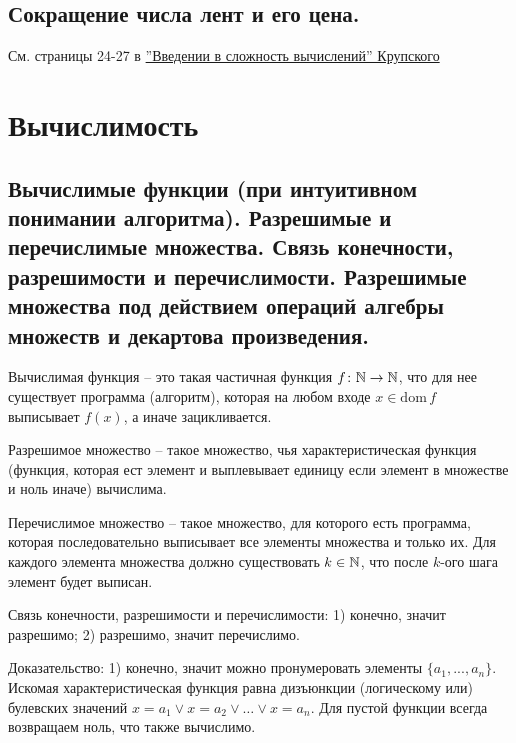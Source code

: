 \documentclass[a4paper, 10pt]{article}
\newcommand{\dom}{\text{dom}\,}
\begin{document}
\subsection{Сокращение числа лент и его цена.}

См. страницы 24-27 в \href{https://static42.fileskachat.com/download/6/c/33377_672968aac1311878215538743df4fbd9.pdf}{''Введении в сложность вычислений'' Крупского}

\section{Вычислимость}

\subsection{Вычислимые функции (при интуитивном понимании алгоритма). Разрешимые и перечислимые множества. Связь конечности, разрешимости и перечислимости. Разрешимые множества под действием операций алгебры множеств и декартова произведения.}

Вычислимая функция -- это такая частичная функция $f\colon\mathbb{N}\to\mathbb{N}$, что для нее существует программа (алгоритм), которая на любом входе $x\in\dom f$ выписывает $f(x)$, а иначе зацикливается.

Разрешимое множество -- такое множество, чья характеристическая функция (функция, которая ест элемент и выплевывает единицу если элемент в множестве и ноль иначе) вычислима.

Перечислимое множество -- такое множество, для которого есть программа, которая последовательно выписывает все элементы множества и только их. Для каждого элемента множества должно существовать $k\in\mathbb{N}$, что после $k$-ого шага элемент будет выписан.

\hfill

Связь конечности, разрешимости и перечислимости: 1) конечно, значит разрешимо; 2) разрешимо, значит перечислимо.

Доказательство: 1) конечно, значит можно пронумеровать элементы $\{a_1,...,a_n\}$. Искомая характеристическая функция равна дизъюнкции (логическому или) булевских значений $x=a_1\lor x=a_2 \lor \ldots \lor x=a_n$. Для пустой функции всегда возвращаем ноль, что также вычислимо.
\end{document}
